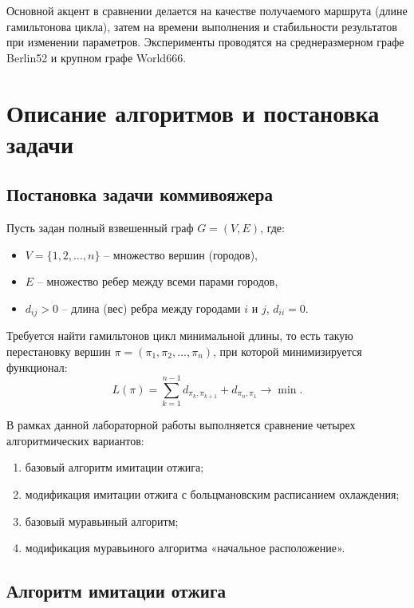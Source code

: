 \documentclass[12pt,a4paper]{article}
\begin{document}
Основной акцент в сравнении делается на качестве получаемого маршрута (длине гамильтонова цикла), затем на времени выполнения и стабильности результатов при изменении параметров. Эксперименты проводятся на среднеразмерном графе Berlin52 и крупном графе World666.

\section{Описание алгоритмов и постановка задачи}
\label{sec:algorithms}

\subsection{Постановка задачи коммивояжера}

Пусть задан полный взвешенный граф $G=(V,E)$, где:
\begin{itemize}
    \item $V=\{1,2,\dots,n\}$ -- множество вершин (городов),
    \item $E$ -- множество ребер между всеми парами городов,
    \item $d_{ij}>0$ -- длина (вес) ребра между городами $i$ и $j$, $d_{ii}=0$.
\end{itemize}

Требуется найти гамильтонов цикл минимальной длины, то есть такую перестановку вершин
$\pi=(\pi_1,\pi_2,\dots,\pi_n)$, при которой минимизируется функционал:
\begin{equation}
L(\pi)=\sum_{k=1}^{n-1} d_{\pi_k,\pi_{k+1}} + d_{\pi_n,\pi_1} \rightarrow \min.
\end{equation}

В рамках данной лабораторной работы выполняется сравнение четырех алгоритмических вариантов:
\begin{enumerate}
    \item базовый алгоритм имитации отжига;
    \item модификация имитации отжига с больцмановским расписанием охлаждения;
    \item базовый муравьиный алгоритм;
    \item модификация муравьиного алгоритма «начальное расположение».
\end{enumerate}

\subsection{Алгоритм имитации отжига}
\end{document}
